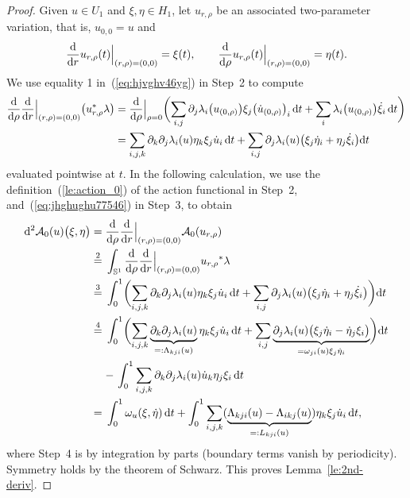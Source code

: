 \documentclass[pdftex]{sigma}
\numberwithin{equation}{section}
\renewcommand{\SS}{{\mathbb{S}}}
\newcommand{\Aa}{{\mathcal{A}}} %
\newcommand{\p}{{\partial}}
\newcommand{\1}{{{\mathchoice {\rm 1\mskip-4mu l} {\rm 1\mskip-4mu l}
{\rm 1\mskip-4.5mu l} {\rm 1\mskip-5mu l}}}}
\begin{document}
\begin{proof}
Given $u\in U_1$ and $\xi,\eta\in H_1$,
let $u_{r,\rho}$ be an associated two-parameter variation, that is,
$u_{0,0}=u$ and
\[
 \frac{{\rm d}}{{\rm d}r} u_{r,\rho}(t)\Big|_{(r,\rho)=(0,0)}=\xi(t)
 ,\qquad
 \frac{{\rm d}}{{\rm d}\rho} u_{r,\rho}(t)\Big|_{(r,\rho)=(0,0)}=\eta(t) .
\]
We use equality 1 in~(\ref{eq:hjvghv46yg}) in Step~2 to compute
{\samepage\begin{align}
 \frac{{\rm d}}{{\rm d}\rho}\frac{{\rm d}}{{\rm d}r}\Big|_{(r,\rho)=(0,0)}
 \bigl(u_{r,\rho}^*\lambda \bigr)
 &= \frac{{\rm d}}{{\rm d}\rho}\Big|_{\rho=0}\biggl(
 \sum_{i,j} \p_j\lambda_i\bigl(u_{(0,\rho)}\bigr) \xi_j \bigl(\dot u_{(0,\rho)}\bigr)_i\, {\rm d}t
 +\sum_i \lambda_i\bigl(u_{(0,\rho)}\bigr) \dot\xi_i\, {\rm d}t\biggr) \nonumber\\
 &=\sum_{i,j,k}\p_k\p_j\lambda_i(u) \eta_k \xi_j \dot u_i\, {\rm d}t
 +\sum_{i,j}\p_j\lambda_i(u)
 \bigl(\xi_j\dot\eta_i+\eta_j\dot\xi_i\bigr) {\rm d}t\label{eq:jhghughu77546}
\end{align}
evaluated pointwise at $t$.}
In the following calculation,
we use the definition~(\ref{le:action_0}) of the action functional
in Step~2, and~(\ref{eq:jhghughu77546}) in Step~3, to obtain
\begin{equation*}
\begin{split}
 {\rm d}^2\Aa_0(u)\bigl(\xi,\eta\bigr)
 ={}&\frac{{\rm d}}{{\rm d}\rho}\frac{{\rm d}}{{\rm d}r}\Big|_{(r,\rho)=(0,0)}\Aa_0(u_{r,\rho})\\
 \stackrel{2}{=}{}&
 \int_{\SS^1} \frac{{\rm d}}{{\rm d}\rho}\frac{{\rm d}}{{\rm d}r}\Big|_{(r,\rho)=(0,0)}
 {u_{r,\rho}}^*\lambda \\
 \stackrel{3}{=}{}&
 \int_0^1 \biggl(\sum_{i,j,k}\p_k\p_j\lambda_i(u) \eta_k \xi_j \dot u_i\, {\rm d}t
 +\sum_{i,j}\p_j\lambda_i(u)
 \bigl(\xi_j\dot\eta_i+\eta_j\dot\xi_i\bigr)\biggr) {\rm d}t
\\
 \stackrel{4}{=}{}&
 \int_0^1 \biggl(\sum_{i,j,k}
 \underbrace{\p_k\p_j\lambda_i(u)}_{=:\Lambda_{kji}(u)}
 \eta_k \xi_j \dot u_i\, {\rm d}t
 +\sum_{i,j}
 \underbrace{\p_j\lambda_i(u)
 \bigl(\xi_j\dot\eta_i-\dot\eta_j\xi_i\bigr)}
 _{=\omega_{ji}(u) \xi_j\dot \eta_i}
 \biggr) {\rm d}t
 \\
 &{}
 {-}\,\int_0^1 \sum_{i,j,k}\p_k\p_j\lambda_i(u) \dot u_k \eta_j \xi_i\, {\rm d}t
 \\
 ={}& %
 \int_0^1 \omega_{u}(\xi,\dot\eta)\, {\rm d}t
 +\int_0^1 \sum_{i,j,k}
 (\underbrace{\Lambda_{kji}(u)-\Lambda_{ikj}(u)}_{=:L_{kji}(u)})
 \eta_k \xi_j \dot u_i
 \, {\rm d}t,
\end{split}
\end{equation*}
where Step~4 is by integration by parts
(boundary terms vanish by periodicity).
Symmetry holds by the theorem of Schwarz.
This proves Lemma~\ref{le:2nd-deriv}.
\end{proof}
\end{document}
